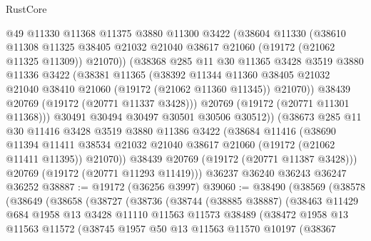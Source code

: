 \begin{lexlean}{RustCore}
\begin{coremodule}
            @49
            @11330
            @11368
            @11375
            @3880
            @11300
            @3422
            (@38604
              @11330
              (@38610
                @11308
                @11325
                @38405
                @21032
                @21040
                @38617
                @21060
                (@19172 (@21062 @11325 @11309))
                @21070))
            (@38368
              @285
              @11
              @30
              @11365
              @3428
              @3519
              @3880
              @11336
              @3422
              (@38381
                @11365
                (@38392
                  @11344
                  @11360
                  @38405
                  @21032
                  @21040
                  @38410
                  @21060
                  (@19172 (@21062 @11360 @11345))
                  @21070))
              @38439
              @20769
              (@19172 (@20771 @11337 @3428)))
            @20769
            (@19172 (@20771 @11301 @11368)))
          @30491
          @30494
          @30497
          @30501
          @30506
          @30512))
      (@38673
        @285
        @11
        @30
        @11416
        @3428
        @3519
        @3880
        @11386
        @3422
        (@38684
          @11416
          (@38690
            @11394
            @11411
            @38534
            @21032
            @21040
            @38617
            @21060
            (@19172 (@21062 @11411 @11395))
            @21070))
        @38439
        @20769
        (@19172 (@20771 @11387 @3428)))
      @20769
      (@19172 (@20771 @11293 @11419)))
    @36237
    @36240
    @36243
    @36247
    @36252
@38887 := @19172 (@36256 @3997)
@39060 := @38490
    (@38569
      (@38578
        (@38649
          (@38658
            (@38727
              (@38736
                (@38744
                  (@38885 @38887)
                  (@38463
                    @11429
                    @684
                    @1958
                    @13
                    @3428
                    @11110
                    @11563
                    @11573
                    @38489
                    (@38472
                      @1958
                      @13
                      @11563
                      @11572
                      (@38745
                        @1957
                        @50
                        @13
                        @11563
                        @11570
                        @10197
                        (@38367

\end{coremodule}
\end{lexlean}
